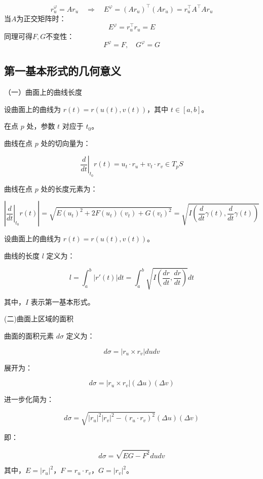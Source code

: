 \documentclass[lang=cn,10pt,thmcnt=section]{elegantbook}
\begin{document}
\[
r_u^\varphi = Ar_u \quad \Rightarrow \quad
E^\varphi = (Ar_u)^\top (Ar_u) = r_u^\top A^\top A r_u
\]
当\( A \)为正交矩阵时：
\[
E^\varphi = r_u^\top r_u = E
\]
同理可得\( F,G \)不变性：
\[
F^\varphi = F, \quad G^\varphi = G
\]

\subsection*{第一基本形式的几何意义}

（一）曲面上的曲线长度

设曲面上的曲线为 $r(t) = r(u(t), v(t))$，其中 $t \in [a, b]$。

在点 $p$ 处，参数 $t$ 对应于 $t_0$。

曲线在点 $p$ 处的切向量为：

$$
\left. \frac{d}{dt} \right|_{t_0} r(t) = u_t \cdot r_u + v_t \cdot r_v \in T_p S
$$

曲线在点 $p$ 处的长度元素为：

$$
\left| \left. \frac{d}{dt} \right|_{t_0} r(t) \right| = \sqrt{E (u_t)^2 + 2 F (u_t)(v_t) + G (v_t)^2} = \sqrt{I \left( \frac{d}{dt} \gamma(t), \frac{d}{dt} \gamma(t) \right)}
$$
\begin{definition}[曲线长度]
    设曲面上的曲线为 $r(t) = r(u(t), v(t))$。

    曲线的长度 $l$ 定义为：
    
    $$
    l = \int_{a}^{b} |r'(t)| dt = \int_{a}^{b} \sqrt{I\left(\frac{dr}{dt}, \frac{dr}{dt}\right)} dt
    $$
    
    其中，$I$ 表示第一基本形式。
    
\end{definition}
(二)曲面上区域的面积

曲面的面积元素 $d\sigma$ 定义为：

$$
d\sigma = |r_u \times r_v| du dv
$$

展开为：

$$
d\sigma = |r_u \times r_v| (\Delta u) (\Delta v)
$$

进一步化简为：

$$
d\sigma = \sqrt{|r_u|^2 |r_v|^2 - (r_u \cdot r_v)^2} (\Delta u) (\Delta v)
$$

即：

$$
d\sigma = \sqrt{EG - F^2} du dv
$$

其中，$E = |r_u|^2$，$F = r_u \cdot r_v$，$G = |r_v|^2$。
\end{document}
